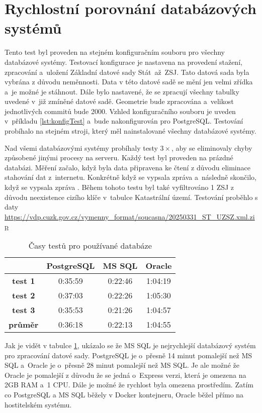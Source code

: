 \section{Rychlostní porovnání databázových systémů}
Tento test byl proveden na stejném konfiguračním souboru pro všechny databázové systémy.
Testovací konfigurace je nastavena na provedení stažení, zpracování a~uložení Základní datové sady Stát~až~ZSJ.
Tato datová sada byla vybrána z důvodu neměnnosti. 
Data v této datové sadě se mění jen velmi zřídka a~je možné je stáhnout.
Dále bylo nastavené, že se zpracují všechny tabulky uvedené v~již zmíněné datové sadě.
Geometrie bude zpracována a~velikost jednotlivých commitů bude 2000.
Vzhled konfiguračního souboru je uveden v~příkladu \ref{lst:konfigTest} a~bude nakonfigurován pro PostgreSQL.
Testování probíhalo na stejném stroji, který měl nainstalované všechny databázové systémy.

Nad všemi databázovými systémy probíhaly testy \(3\times\), aby se eliminovaly chyby způsobené jinými procesy na serveru.
Každý test byl proveden na prázdné databázi.
Měření začalo, když byla data připravena ke čtení z důvodu eliminace stahování dat z~internetu.
Konkrétně když se vypsala zpráva  a~následně skončilo, když se 
vypsala zpráva .
Během tohoto testu byl také vyfiltrováno 1 ZSJ z důvodu neexistence cizího klíče v~tabulce Katastrální území.
Testování proběhlo s daty \url{https://vdp.cuzk.gov.cz/vymenny_format/soucasna/20250331_ST_UZSZ.xml.zip}

\begin{table}[!h]
  \centering
  \caption{Časy testů pro používané databáze}
  \label{tab:test1}
  \begin{tabular}{|c|c|c|c|}
  \hline
                  & \textbf{PostgreSQL} & \textbf{MS SQL} & \textbf{Oracle} \\ \hline
  \textbf{test 1} & 0:35:59             & 0:22:46         & 1:04:19         \\ \hline
  \textbf{test 2} & 0:37:03             & 0:22:26         & 1:05:30         \\ \hline
  \textbf{test 3} & 0:35:53             & 0:21:26         & 1:04:57         \\ \hline
  \textbf{průměr} & 0:36:18             & 0:22:13         & 1:04:55         \\ \hline
  \end{tabular}
\end{table}

Jak je vidět v tabulce \ref{tab:test1}, ukázalo se že MS SQL je nejrychlejší databázový systém pro zpracování datové sady.
PostgreSQL je o~přesně 14 minut pomalejší než MS SQL a~Oracle je o~přesně 28 minut pomalejší než MS SQL.
Je ale možné že Oracle je pomalejší z důvodu že se jedná o~Express verzi, která je omezena na 2GB RAM a~1 CPU.
Dále je možné že rychlost byla omezena prostředím. Zatím co PostgreSQL a MS SQL běžely v Docker kontejneru, 
Oracle běžel přímo na hostitelském systému.

